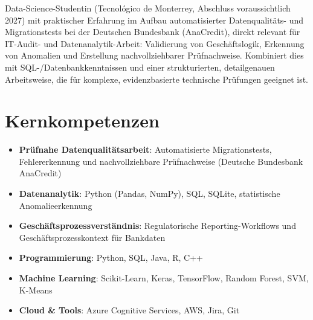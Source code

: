 \documentclass[11pt,a4paper,sans]{moderncv}
\begin{document}
\makecvtitle


\vspace{6pt}
\small{Data-Science-Studentin (Tecnológico de Monterrey, Abschluss voraussichtlich 2027) mit praktischer Erfahrung im Aufbau automatisierter Datenqualitäts- und Migrationstests bei der Deutschen Bundesbank (AnaCredit), direkt relevant für IT-Audit- und Datenanalytik-Arbeit: Validierung von Geschäftslogik, Erkennung von Anomalien und Erstellung nachvollziehbarer Prüfnachweise. Kombiniert dies mit SQL-/Datenbankkenntnissen und einer strukturierten, detailgenauen Arbeitsweise, die für komplexe, evidenzbasierte technische Prüfungen geeignet ist.}


\section{Kernkompetenzen}
\vspace{1pt}
\begin{itemize}

\item \textbf{Prüfnahe Datenqualitätsarbeit}: Automatisierte Migrationstests, Fehlererkennung und nachvollziehbare Prüfnachweise (Deutsche Bundesbank AnaCredit)

\item \textbf{Datenanalytik}: Python (Pandas, NumPy), SQL, SQLite, statistische Anomalieerkennung

\item \textbf{Geschäftsprozessverständnis}: Regulatorische Reporting-Workflows und Geschäftsprozesskontext für Bankdaten

\item \textbf{Programmierung}: Python, SQL, Java, R, C++

\item \textbf{Machine Learning}: Scikit-Learn, Keras, TensorFlow, Random Forest, SVM, K-Means

\item \textbf{Cloud \& Tools}: Azure Cognitive Services, AWS, Jira, Git

\end{itemize}

\end{document}
